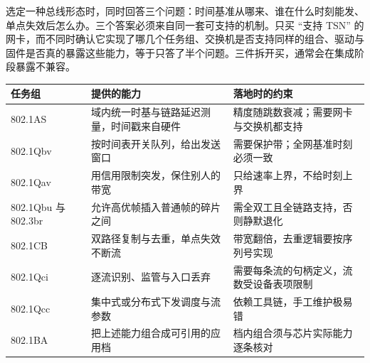 \documentclass[12pt,a4paper,fontset=fandol]{ctexbook}
\begin{document}
\begin{guideline}[title={协议选型是同步、整形、冗余三件事一起选}]
选定一种总线形态时，同时回答三个问题：时间基准从哪来、谁在什么时刻能发、单点失效后怎么办。三个答案必须来自同一套可支持的机制。只买 ``支持 TSN'' 的网卡，而不同时确认它实现了哪几个任务组、交换机是否支持同样的组合、驱动与固件是否真的暴露这些能力，等于只答了半个问题。三件拆开买，通常会在集成阶段暴露不兼容。
\end{guideline}

\begin{center}
\begin{tabular}{>{\raggedright\arraybackslash}p{} >{\raggedright\arraybackslash}p{} >{\raggedright\arraybackslash}p{}}
\toprule
任务组 & 提供的能力 & 落地时的约束 \\
\midrule
802.1AS & 域内统一时基与链路延迟测量，时间戳来自硬件 & 精度随跳数衰减；需要网卡与交换机都支持 \\
802.1Qbv & 按时间表开关队列，给出发送窗口 & 需要保护带；全网基准时刻必须一致 \\
802.1Qav & 用信用限制突发，保住别人的带宽 & 只给速率上界，不给时刻上界 \\
802.1Qbu 与 802.3br & 允许高优帧插入普通帧的碎片之间 & 需全双工且全链路支持，否则静默退化 \\
802.1CB & 双路径复制与去重，单点失效不断流 & 带宽翻倍，去重逻辑要按序列号实现 \\
802.1Qci & 逐流识别、监管与入口丢弃 & 需要每条流的句柄定义，流数受设备表项限制 \\
802.1Qcc & 集中式或分布式下发调度与流参数 & 依赖工具链，手工维护极易错 \\
802.1BA & 把上述能力组合成可引用的应用档 & 档内组合须与芯片实际能力逐条核对 \\
\bottomrule
\end{tabular}
\end{center}
\end{document}
